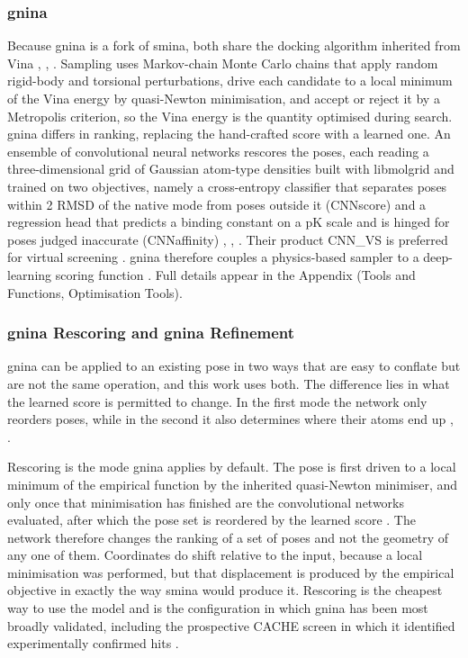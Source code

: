 \hypertarget{gnina}{%
\subsubsection{gnina}\label{gnina}}

Because gnina is a fork of smina, both share the docking algorithm inherited from Vina \cite{ref056}, \cite{ref067}, \cite{ref068}. Sampling uses Markov-chain Monte Carlo chains that apply random rigid-body and torsional perturbations, drive each candidate to a local minimum of the Vina energy by quasi-Newton minimisation, and accept or reject it by a Metropolis criterion, so the Vina energy is the quantity optimised during search. gnina differs in ranking, replacing the hand-crafted score with a learned one. An ensemble of convolutional neural networks rescores the poses, each reading a three-dimensional grid of Gaussian atom-type densities built with libmolgrid \cite{ref076} and trained on two objectives, namely a cross-entropy classifier that separates poses within 2\angstrom{} RMSD of the native mode from poses outside it (CNNscore) and a regression head that predicts a binding constant on a pK scale and is hinged for poses judged inaccurate (CNNaffinity) \cite{ref075}, \cite{ref056}, \cite{ref067}. Their product CNN\_VS is preferred for virtual screening \cite{ref068}. gnina therefore couples a physics-based sampler to a deep-learning scoring function \cite{ref058}. Full details appear in the Appendix (Tools and Functions, Optimisation Tools).

\hypertarget{gnina-rescoring-and-gnina-refinement}{%
\subsubsection{gnina Rescoring and gnina Refinement}\label{gnina-rescoring-and-gnina-refinement}}

gnina can be applied to an existing pose in two ways that are easy to conflate but are not the same operation, and this work uses both. The difference lies in what the learned score is permitted to change. In the first mode the network only reorders poses, while in the second it also determines where their atoms end up \cite{ref056}, \cite{ref058}.

Rescoring is the mode gnina applies by default. The pose is first driven to a local minimum of the empirical function by the inherited quasi-Newton minimiser, and only once that minimisation has finished are the convolutional networks evaluated, after which the pose set is reordered by the learned score \cite{ref056}. The network therefore changes the ranking of a set of poses and not the geometry of any one of them. Coordinates do shift relative to the input, because a local minimisation was performed, but that displacement is produced by the empirical objective in exactly the way smina would produce it. Rescoring is the cheapest way to use the model and is the configuration in which gnina has been most broadly validated, including the prospective CACHE screen in which it identified experimentally confirmed hits \cite{ref068}.

